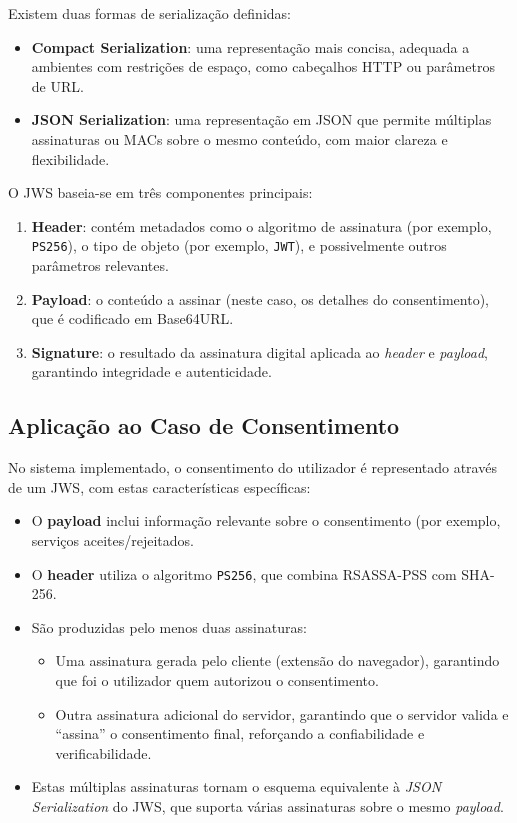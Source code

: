 Existem duas formas de serialização definidas:

\begin{itemize}
  \item \textbf{Compact Serialization}: uma representação mais concisa, adequada a ambientes com restrições de espaço, como cabeçalhos HTTP ou parâmetros de URL.
  \item \textbf{JSON Serialization}: uma representação em JSON que permite múltiplas assinaturas ou MACs sobre o mesmo conteúdo, com maior clareza e flexibilidade.
\end{itemize}

O JWS baseia-se em três componentes principais:

\begin{enumerate}
  \item \textbf{Header}: contém metadados como o algoritmo de assinatura (por exemplo, \texttt{PS256}), o tipo de objeto (por exemplo, \texttt{JWT}), e possivelmente outros parâmetros relevantes.
  \item \textbf{Payload}: o conteúdo a assinar (neste caso, os detalhes do consentimento), que é codificado em Base64URL.
  \item \textbf{Signature}: o resultado da assinatura digital aplicada ao \textit{header} e \textit{payload}, garantindo integridade e autenticidade.
\end{enumerate}

\subsection{Aplicação ao Caso de Consentimento}

No sistema implementado, o consentimento do utilizador é representado através de um JWS, com estas características específicas:

\begin{itemize}
  \item O \textbf{payload} inclui informação relevante sobre o consentimento (por exemplo, serviços aceites/rejeitados.
  \item O \textbf{header} utiliza o algoritmo \texttt{PS256}, que combina RSASSA-PSS com SHA-256.
  \item São produzidas pelo menos duas assinaturas:
    \begin{itemize}
      \item Uma assinatura gerada pelo cliente (extensão do navegador), garantindo que foi o utilizador quem autorizou o consentimento.
      \item Outra assinatura adicional do servidor, garantindo que o servidor valida e “assina” o consentimento final, reforçando a confiabilidade e verificabilidade.
    \end{itemize}
  \item Estas múltiplas assinaturas tornam o esquema equivalente à \textit{JSON Serialization} do JWS, que suporta várias assinaturas sobre o mesmo \textit{payload}.
\end{itemize}

